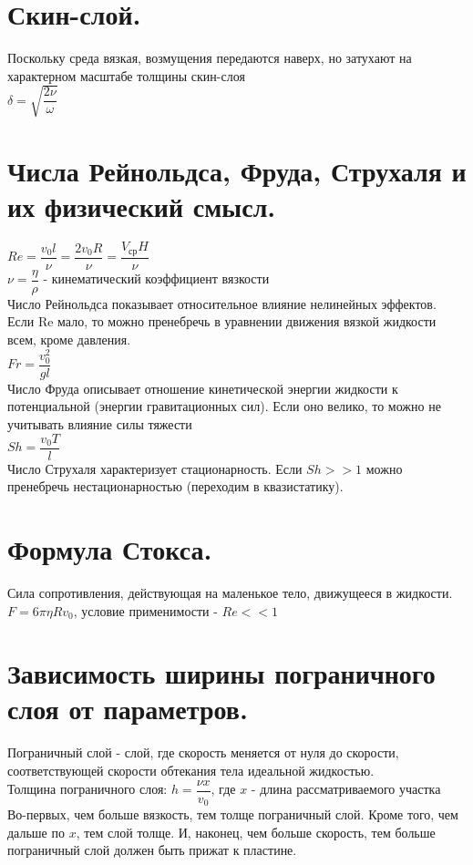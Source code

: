 \begin{multicols*}{2}
		\section{Скин-слой.}
		Поскольку среда вязкая, возмущения передаются наверх, но затухают на характерном масштабе толщины скин-слоя \\
		$\delta=\sqrt{\dfrac{2\nu}{\omega}}$
		
		\section{Числа Рейнольдса, Фруда, Струхаля и их физический смысл.}
		$Re=\dfrac{v_0l}{\nu}=\dfrac{2v_0R}{\nu} = \dfrac{V_\text{ср}H}{\nu}$\\
		$\nu=\dfrac{\eta}{\rho}$ - кинематический коэффициент вязкости \\
		Число Рейнольдса показывает относительное влияние нелинейных эффектов. Если Re мало, то можно пренебречь в уравнении движения вязкой жидкости всем, кроме давления. \\
		$Fr=\dfrac{v_0^2}{gl}$ \\
		Число Фруда описывает отношение кинетической энергии жидкости к потенциальной (энергии гравитационных сил). Если оно велико, то можно не учитывать влияние силы тяжести \\
		$Sh=\dfrac{v_0T}{l}$ \\
		Число Струхаля характеризует стационарность. Если $Sh >> 1$ можно пренебречь нестационарностью (переходим в квазистатику).
		
		\section{Формула Стокса.}
		Сила сопротивления, действующая на маленькое тело, движущееся в жидкости.\\
		$F=6\pi\eta Rv_0$, условие применимости - $Re << 1$
		
		\section{Зависимость ширины пограничного слоя от параметров.}
		Пограничный слой - слой, где скорость меняется от нуля до скорости, соответствующей скорости обтекания тела идеальной жидкостью.\\
		Толщина пограничного слоя: $h = \dfrac{\nu x}{v_0}$, где $x$ - длина рассматриваемого участка\\
		Во-первых, чем больше вязкость, тем толще пограничный слой. Кроме того, чем дальше по $x$, тем слой толще. И, наконец, чем больше скорость, тем больше пограничный слой должен быть прижат к пластине.
		

\end{multicols*}
